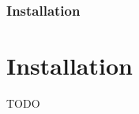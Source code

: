 
\begin{frame}

    \frametitle{Installation}
    \section{Installation}\label{sec:installation}

    TODO


\end{frame}